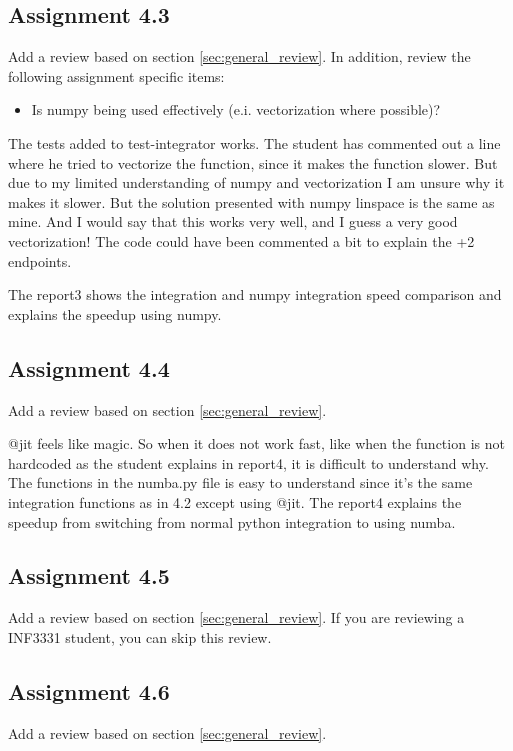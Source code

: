 \documentclass[a4paper]{article}
\begin{document}
\subsection*{Assignment 4.3}
Add a review based on section \ref{sec:general_review}. In addition, review the following assignment specific items: 
\begin{itemize}
  \item Is numpy being used effectively (e.i. vectorization where possible)?
\end{itemize}

The tests added to test-integrator works. The student has commented out a line where he tried to vectorize the function, since it makes the function slower. But due to my limited understanding of numpy and vectorization I am unsure why it makes it slower.  But the solution presented with numpy linspace is the same as mine. And I would say that this works very well, and I guess a very good vectorization!
The code could have been commented a bit to explain the +2 endpoints.

The report3 shows the integration and numpy integration speed comparison and explains the speedup using numpy. 


\subsection*{Assignment 4.4}
Add a review based on section \ref{sec:general_review}.

@jit feels like magic. So when it does not work fast, like when the function is not hardcoded as the student explains in report4, it is difficult to understand why. 
The functions in the numba.py file is easy to understand since it's the same integration functions as in 4.2 except using @jit. 
The report4 explains the speedup from switching from normal python integration to using numba. 

\subsection*{Assignment 4.5}
Add a review based on section \ref{sec:general_review}. If you are reviewing a INF3331 student, you can skip this review.

\subsection*{Assignment 4.6}
Add a review based on section \ref{sec:general_review}.
\end{document}
